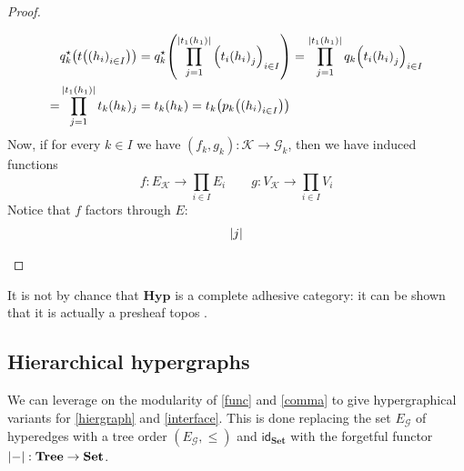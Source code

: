 \documentclass[runningheads,envcountsect]{lmcs}
\newcommand{\hyp}{\catname{Hyp}}
\newcommand{\catname}[1]{\mathbf{#1}}
\newcommand{\id}[1]{\mathsf{id}_{#1}}
\newcommand{\tree}{\catname{Tree}}
\theoremstyle{plain}
\theoremstyle{definition}
\begin{document}
\begin{proof}
\begin{itemize}
\begin{align*}
		&q^{\star}_k\qty(t\qty(\qty(h_i)_{i\in I}))=q^\star_k\qty(\prod_{j=1}^{\abs{t_1\qty(h_1)}}\qty(t_i\qty(h_i)_j)_{i\in I})=\prod_{j=1}^{\abs{t_1\qty(h_1)}}q_k\qty(t_i\qty(h_i)_j)_{i\in I}\\=&\prod_{j=1}^{\abs{t_1\qty(h_1)}}t_k(h_k)_j=t_k\qty(h_k)=t_k\qty(p_k\qty(\qty(h_i)_{i\in I}))
		\end{align*}
		Now, if for every $k\in I$ we have $(f_k, g_k):\mathcal{K}\to \mathcal{G}_k$, then we have induced functions
		\[f:E_{\mathcal{K}}\to \prod_{i\in I} E_i \qquad g:V_{\mathcal{K}}\to \prod_{i\in I} V_i\]
		Notice that $f$ factors through $E$:
		\begin{align*}
		\abs{j}
		\end{align*}	
	\end{itemize} 
\end{proof}

\begin{rem} It is not by chance that $\hyp$ is a complete adhesive category: it can be shown that it is actually a presheaf topos \cite{bonchi2022string}.
\end{rem}
\fi 



\subsection{Hierarchical hypergraphs}\label{subsec:hhgraph}  We can leverage on the modularity of \cref{func} and \cref{comma} to give hypergraphical variants for \cref{hiergraph} and \cref{interface}. This is done replacing the set $E_\mathcal{G}$ of hyperedges with a tree order $(E_\mathcal{G}, \leq)$ and $\id{\catname{Set}}$ with the forgetful functor $\abs{-}:\tree\to \catname{Set}$.
\end{document}
